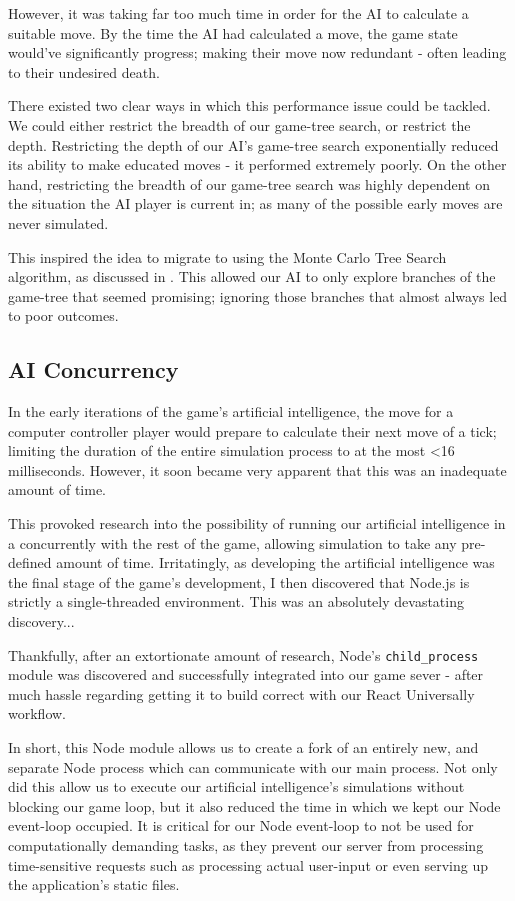 \documentclass{standalone}
\begin{document}
			However, it was taking far too much time in order for the AI to calculate a suitable move. By the time the AI had calculated a move, the game state would've significantly progress; making their move now redundant - often leading to their undesired death.

			There existed two clear ways in which this performance issue could be tackled. We could either restrict the breadth of our game-tree search, or restrict the depth. Restricting the depth of our AI's game-tree search exponentially reduced its ability to make educated moves - it performed extremely poorly. On the other hand, restricting the breadth of our game-tree search was highly dependent on the situation the AI player is current in; as many of the possible early moves are never simulated.

			This inspired the idea to migrate to using the Monte Carlo Tree Search algorithm, as discussed in . This allowed our AI to only explore branches of the game-tree that seemed promising; ignoring those branches that almost always led to poor outcomes.

		\subsection{AI Concurrency}
			In the early iterations of the game's artificial intelligence, the move for a computer controller player would prepare to calculate their next move of a tick; limiting the duration of the entire simulation process to at the most \textless 16 milliseconds. However, it soon became very apparent that this was an inadequate amount of time.

			This provoked research into the possibility of running our artificial intelligence in a concurrently with the rest of the game, allowing simulation to take any pre-defined amount of time. Irritatingly, as developing the artificial intelligence was the final stage of the game's development, I then discovered that Node.js is strictly a single-threaded environment. This was an absolutely devastating discovery...

			Thankfully, after an extortionate amount of research, Node's \texttt{child\_process} module \parencite{nodeChildProcess} was discovered and successfully integrated into our game sever - after much hassle regarding getting it to build correct with our React Universally workflow.

			In short, this Node module allows us to create a fork of an entirely new, and separate Node process which can communicate with our main process. Not only did this allow us to execute our artificial intelligence's simulations without blocking our game loop, but it also reduced the time in which we kept our Node event-loop occupied. It is critical for our Node event-loop to not be used for computationally demanding tasks, as they prevent our server from processing time-sensitive requests such as processing actual user-input or even serving up the application's static files.
\end{document}
